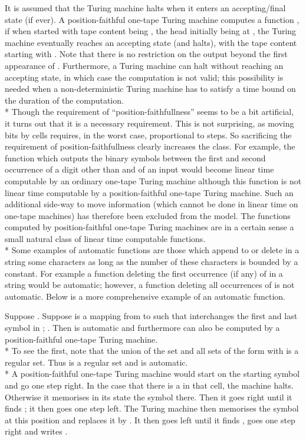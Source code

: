 \documentclass{LMCS}
\theoremstyle{plain}\newtheorem{athm}[thm]{Theorem}
\theoremstyle{plain}\newtheorem{aprop}[thm]{Proposition}
\theoremstyle{plain}\newtheorem{aprob}[thm]{Open Problem}
\theoremstyle{plain}\newtheorem{acor}[thm]{Corollary}
\theoremstyle{plain}\newtheorem{alem}[thm]{Lemma}
\theoremstyle{definition}\newtheorem{adefn}[thm]{Definition}
\theoremstyle{definition}\newtheorem{arem}[thm]{Remark}
\theoremstyle{plain}\newtheorem{aexmp}[thm]{Example}
\theoremstyle{plain}\newtheorem{aclm}[thm]{Claim}
\def\sp{\\*\indent}
\begin{document}
It is assumed that the Turing machine halts when it enters an accepting/final 
state (if ever).
A position-faithful one-tape Turing machine computes a function , if
when started with tape content being   ,
the head initially being at , the Turing machine eventually
reaches an accepting state (and halts), 
with the tape content starting with .
Note that there is no restriction on the output beyond the
first appearance of . Furthermore, a Turing machine can halt
without reaching an accepting state, in which case the computation is
not valid; this possibility is needed when a non-deterministic Turing
machine has to satisfy a time bound on the duration of the computation.
\sp
Though the requirement of ``position-faithfullness'' seems to be a bit
artificial, it turns out that it is a necessary requirement. This is
not surprising, as moving  bits by  cells requires, in the worst case,
proportional to  steps. So sacrificing the requirement
of position-faithfullness clearly increases the class. For example,
the function which outputs the binary symbols between the first and
second occurrence of a digit other than  and  of an input would
become linear time computable by an ordinary one-tape Turing machine
although this function is not linear time
computable by a position-faithful one-tape Turing machine. Such an
additional side-way to move information (which cannot
be done in linear time on one-tape machines) 
has therefore been excluded from the model.
The functions computed by position-faithful one-tape Turing
machines are in a certain sense a small natural class of linear time
computable functions.
\sp
Some examples of automatic functions are those which append to or delete in
a string some characters as long as the number of these characters is bounded
by a constant. For example a function deleting the first 
occurrence (if any)
of  in a string would be automatic; however, a function deleting all
occurrences of  is not automatic. Below is a more comprehensive example
of an automatic function.

\begin{exa} \label{ex:firstlastexchange}
Suppose . Suppose  is a mapping from  to
 such that  interchanges the first and last symbol in ;
.
Then  is automatic and furthermore  can also be computed by a
position-faithful one-tape Turing machine.
\sp
To see the first, note that the union of the set
 and
all sets of the form  with  is a regular set.
Thus 
is a regular set and  is automatic.
\sp
A position-faithful one-tape Turing machine would start on the
starting symbol  and go one step right. In the case
that there is a  in that cell,
the machine halts. Otherwise it memorises in
its state the symbol  there. Then it goes right until it finds
; it then goes one step left. 
The Turing machine then memorises the symbol  at this position
and replaces it by . It then goes left until it finds ,
goes one step right and writes .
\end{exa}
\end{document}
